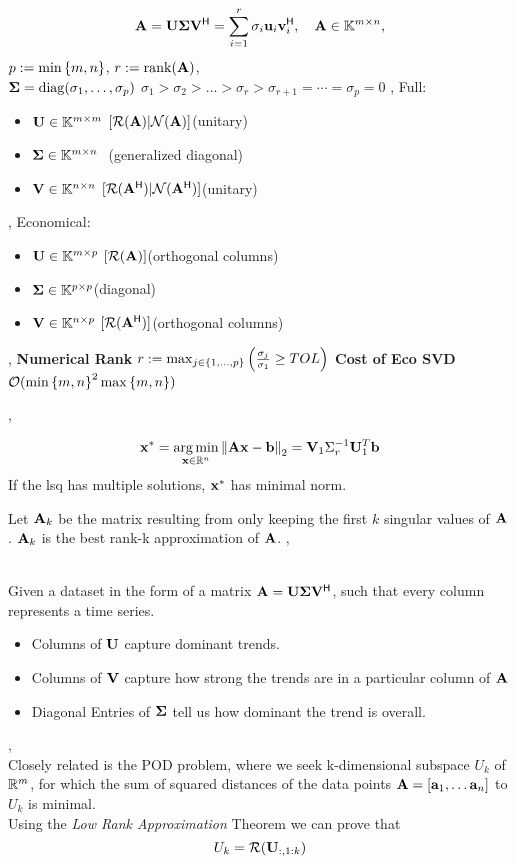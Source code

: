 \[
\mathbf{A} =
\mathbf{U}\mathbf{\Sigma}\mathbf{V}^{\mathsf{H}}
=\sum_{i=1}^{r} \sigma_i \mathbf{u}_i \mathbf{v}_i^{\mathsf{H}},
\quad\mathbf{A}\in\mathbb{K}^{m\times n},
\]
$p:=\min\left\{ m,n \right\}$, $r:=\operatorname{rank}(\mathbf{A})$, \\
$\mathbf{\Sigma}=\operatorname{diag}(\sigma_1,\ldots,\sigma_p)$
$\sigma_1>\sigma_2>\ldots>\sigma_r>\sigma_{r+1}=\cdots=\sigma_p=0$
\sep
Full: 
\begin{itemize}
  \item $\mathbf{U}\in\mathbb{K}^{m\times m}$ $[\mathcal{R}(\mathbf{A})|\mathcal{N}(\mathbf{A})]$\qquad (unitary)
  \item $\mathbf{\Sigma}\in\mathbb{K}^{m\times n}$\quad\quad\,\, (generalized
  diagonal)
  \item $\mathbf{V}\in\mathbb{K}^{n\times n}$ $[\mathcal{R}(\mathbf{A}^{\mathsf{H}})|\mathcal{N}(\mathbf{A}^{\mathsf{H}})]$\qquad (unitary)
\end{itemize}
\sep
Economical:
\begin{itemize}
  \item $\mathbf{U} \in \mathbb{K}^{m\times p}$ $[\mathcal{R}(\mathbf{A})]$\qquad (orthogonal columns)
  \item $\mathbf{\Sigma}\in\mathbb{K}^{p\times p}$\qquad\qquad\quad (diagonal)
  \item $\mathbf{V}\in\mathbb{K}^{n\times p}$ $[\mathcal{R}(\mathbf{A}^{\mathsf{H}})]$\qquad (orthogonal columns)
\end{itemize}
\sep
\textbf{Numerical Rank}
$r:=\max_{j\in\left\{ 1,\ldots,p \right\}}\left(\frac{\sigma_j}{\sigma_1}\geq TOL\right)$
\textbf{Cost of Eco SVD} $\mathcal{O}(\min\left\{ m,n \right\}^2\max\left\{ m,n \right\})$

\sep

$$ \mathbf{x}^* = \operatorname*{arg\,min}_{\mathbf{x}\in\mathbb{R}^n}\left\lVert \mathbf{A}\mathbf{x}-\mathbf{b} \right\rVert_2 = \mathbf{V}_1 \Sigma_r^{-1}\mathbf{U}_1^T \mathbf{b}$$
If the lsq has multiple solutions, $\mathbf{x}^*$ has minimal norm.


 Let $\mathbf{A}_k$ be the matrix resulting from only keeping the first $k$ singular values of $\mathbf{A}$. $\mathbf{A}_k$ is the best rank-k approximation of $\mathbf{A}$.
\sep

\\Given a dataset in the form of a matrix $\mathbf{A} =
\mathbf{U}\mathbf{\Sigma}\mathbf{V}^{\mathsf{H}}$, such that every column represents a time series.
\begin{itemize}
  \item Columns of $\mathbf{U}$ capture dominant trends.
  \item Columns of $\mathbf{V}$ capture how strong the trends are in a particular column of $\mathbf{A}$
  \item Diagonal Entries of $\mathbf{\Sigma}$ tell us how dominant the trend is overall.
\end{itemize}
\sep
{}  \\Closely related is the POD problem, where we seek k-dimensional subspace $U_k$ of $\mathbb{R}^m$, for which the sum of squared distances of the data points $\mathbf{A} = [\mathbf{a}_1, \dots \mathbf{a}_n]$ to $U_k$ is minimal. \\
Using the \textit{Low Rank Approximation} Theorem we can prove that
$$U_k = \mathcal{R}(\mathbf{U}_{:,1:k})$$

